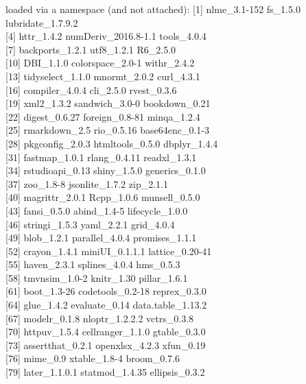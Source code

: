 \documentclass[
  english,
  man, noextraspace]{apa7}
\begin{document}
\begin{appendix}
loaded via a namespace (and not attached): {[}1{]} nlme\_3.1-152
fs\_1.5.0 lubridate\_1.7.9.2\\
{[}4{]} httr\_1.4.2 numDeriv\_2016.8-1.1 tools\_4.0.4\\
{[}7{]} backports\_1.2.1 utf8\_1.2.1 R6\_2.5.0\\
{[}10{]} DBI\_1.1.0 colorspace\_2.0-1 withr\_2.4.2\\
{[}13{]} tidyselect\_1.1.0 mnormt\_2.0.2 curl\_4.3.1\\
{[}16{]} compiler\_4.0.4 cli\_2.5.0 rvest\_0.3.6\\
{[}19{]} xml2\_1.3.2 sandwich\_3.0-0 bookdown\_0.21\\
{[}22{]} digest\_0.6.27 foreign\_0.8-81 minqa\_1.2.4\\
{[}25{]} rmarkdown\_2.5 rio\_0.5.16 base64enc\_0.1-3\\
{[}28{]} pkgconfig\_2.0.3 htmltools\_0.5.0 dbplyr\_1.4.4\\
{[}31{]} fastmap\_1.0.1 rlang\_0.4.11 readxl\_1.3.1\\
{[}34{]} rstudioapi\_0.13 shiny\_1.5.0 generics\_0.1.0\\
{[}37{]} zoo\_1.8-8 jsonlite\_1.7.2 zip\_2.1.1\\
{[}40{]} magrittr\_2.0.1 Rcpp\_1.0.6 munsell\_0.5.0\\
{[}43{]} fansi\_0.5.0 abind\_1.4-5 lifecycle\_1.0.0\\
{[}46{]} stringi\_1.5.3 yaml\_2.2.1 grid\_4.0.4\\
{[}49{]} blob\_1.2.1 parallel\_4.0.4 promises\_1.1.1\\
{[}52{]} crayon\_1.4.1 miniUI\_0.1.1.1 lattice\_0.20-41\\
{[}55{]} haven\_2.3.1 splines\_4.0.4 hms\_0.5.3\\
{[}58{]} tmvnsim\_1.0-2 knitr\_1.30 pillar\_1.6.1\\
{[}61{]} boot\_1.3-26 codetools\_0.2-18 reprex\_0.3.0\\
{[}64{]} glue\_1.4.2 evaluate\_0.14 data.table\_1.13.2\\
{[}67{]} modelr\_0.1.8 nloptr\_1.2.2.2 vctrs\_0.3.8\\
{[}70{]} httpuv\_1.5.4 cellranger\_1.1.0 gtable\_0.3.0\\
{[}73{]} assertthat\_0.2.1 openxlsx\_4.2.3 xfun\_0.19\\
{[}76{]} mime\_0.9 xtable\_1.8-4 broom\_0.7.6\\
{[}79{]} later\_1.1.0.1 statmod\_1.4.35 ellipsis\_0.3.2

\newpage


\end{appendix}
\end{document}
